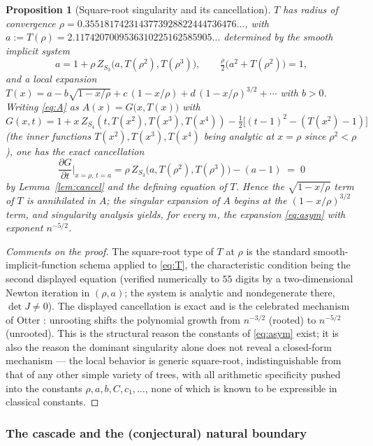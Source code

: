 \documentclass[11pt]{article}
\newtheorem{proposition}[theorem]{Proposition}
\theoremstyle{definition}
\begin{document}
\begin{proposition}[Square-root singularity and its cancellation]
\label{prop:otter}
$T$ has radius of convergence
$\rho=0.3551817423143773928822444736476\ldots$, with
$a:=T(\rho)=2.1174207009536310225162585905\ldots$ determined by the smooth
implicit system
\[
a=1+\rho\,Z_{S_3}\bigl(a,T(\rho^2),T(\rho^3)\bigr),
\qquad
\tfrac{\rho}{2}\bigl(a^2+T(\rho^2)\bigr)=1 ,
\]
and a local expansion
$T(x)=a-b\sqrt{1-x/\rho}+c\,(1-x/\rho)+d\,(1-x/\rho)^{3/2}+\cdots$ with $b>0$.
Writing \eqref{eq:A} as $A(x)=G\bigl(x,T(x)\bigr)$ with
$G(x,t)=1+x\,Z_{S_4}(t,T(x^2),T(x^3),T(x^4))-\tfrac12\bigl[(t-1)^2-(T(x^2)-1)\bigr]$
(the inner functions $T(x^2),T(x^3),T(x^4)$ being analytic at $x=\rho$ since
$\rho^2<\rho$), one has the exact cancellation
\[
\frac{\partial G}{\partial t}\Big|_{x=\rho,\,t=a}
= \rho\,Z_{S_3}\bigl(a,T(\rho^2),T(\rho^3)\bigr)-(a-1)
\;=\;0
\]
by Lemma~\ref{lem:cancel} and the defining equation of $T$. Hence the
$\sqrt{1-x/\rho}$ term of $T$ is annihilated in $A$; the singular expansion of
$A$ begins at the $(1-x/\rho)^{3/2}$ term, and singularity analysis
\cite[VI--VII]{FS2009} yields, for every $m$, the expansion \eqref{eq:asym} with
exponent $n^{-5/2}$.
\end{proposition}

\begin{proof}[Comments on the proof]
The square-root type of $T$ at $\rho$ is the standard smooth-implicit-function
schema \cite[Thm.~VII.3]{FS2009} applied to \eqref{eq:T}, the characteristic
condition being the second displayed equation (verified numerically to $55$
digits by a two-dimensional Newton iteration in $(\rho,a)$; the system is
analytic and nondegenerate there, $\det J \neq 0$). The displayed cancellation
is exact and is the celebrated mechanism of Otter \cite{Otter1948}: unrooting
shifts the polynomial growth from $n^{-3/2}$ (rooted) to $n^{-5/2}$ (unrooted).
This is the structural reason the constants of \eqref{eq:asym} exist; it is also
the reason the dominant singularity alone does not reveal a closed-form
mechanism --- the local behavior is generic square-root, indistinguishable from
that of any other simple variety of trees, with all arithmetic specificity pushed
into the constants $\rho,a,b,C,c_1,\dots$, none of which is known to be
expressible in classical constants.
\end{proof}

\subsubsection{The cascade and the (conjectural) natural boundary}
\end{document}
